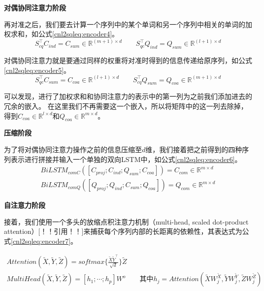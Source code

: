 \textbf{对偶协同注意力阶段}

再对准之后，我们要去计算一个序列中的某个单词和另一个序列中相关的单词的加权求和，如公式\ref{cnl2sqleq:encoder4}。
\begin{equation}
  \label{cnl2sqleq:encoder4}
  S_{cq}^{\top}C_{ind} = C_{sum} \in \mathbb{R}^{(m+1) \times d} \qquad S_{qc}^{\top}Q_{ind} = Q_{sum} \in \mathbb{R}^{(l+1) \times d}
\end{equation}

对偶协同注意力就是要通过同样的权重将对准时得到的信息传递给原序列，如公式\ref{cnl2sqleq:encoder5}。
\begin{equation}
  \label{cnl2sqleq:encoder5}
  S_{qc}^{\top}C_{sum} = C_{coa} \in \mathbb{R}^{(l+1) \times d} \qquad S_{cq}^{\top}Q_{sum} = Q_{coa} \in \mathbb{R}^{(m+1) \times d}
\end{equation}

可以发现，进行了加权求和和协同注意力的表示中的第一列为之前我们添加进去的冗余的嵌入。
在这里我们不再需要这一个嵌入，所以将矩阵中的这一列去除掉，得到$C_{coa} \in \mathbb{R}^{l \times d}$和$Q_{coa} \in \mathbb{R}^{m \times d}$。

\textbf{压缩阶段}

为了将对偶协同注意力操作之前的信息压缩至$d$维，我们接着把之前得到的四种序列表示进行拼接并输入一个单独的双向LSTM中，如公式\ref{cnl2sqleq:encoder6}。
\begin{align}
  \label{cnl2sqleq:encoder6}
  BiLSTM_{comC}([C_{proj};C_{ind};Q_{sum};C_{coa}]) =  C_{com} \in \mathbb{R}^{m \times d}\\
  BiLSTM_{comQ}([Q_{proj};Q_{ind};C_{sum};Q_{coa}]) =  Q_{com} \in \mathbb{R}^{m \times d}
\end{align}

\textbf{自注意力阶段}

接着，我们使用一个多头的放缩点积注意力机制（multi-head, scaled dot-product attention）[！！引用！！]来捕获每个序列内部的长距离的依赖性，其表达式为公式\ref{cnl2sqleq:encoder7}。

\begin{gather}
  \label{cnl2sqleq:encoder7}
  Attention(\widetilde{X},\widetilde{Y},\widetilde{Z}) = softmax\{\frac{\widetilde{X}\widetilde{Y}^{\top}}{\sqrt{d}}\} \widetilde{Z}\\
  MultiHead(\widetilde{X},\widetilde{Y},\widetilde{Z}) = [h_1;\cdots;h_p]W^o \qquad \mbox{其中}h_j= Attention(\widetilde{X}W^{\widetilde{X}}_j,\widetilde{Y}W^{\widetilde{Y}}_j,\widetilde{Z}W^{\widetilde{Z}}_j)
\end{gather}

